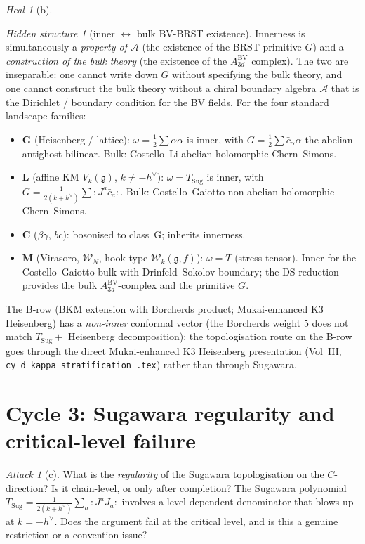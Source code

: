 \documentclass{article}
\theoremstyle{definition}
\theoremstyle{remark}
\newtheorem{attack}[theorem]{Attack}
\newtheorem{heal}[theorem]{Heal}
\newtheorem{hidden}[theorem]{Hidden structure}
\newcommand{\fg}{\mathfrak{g}}
\newcommand{\cW}{\mathcal{W}}
\newcommand{\cA}{\mathcal{A}}
\begin{document}
\begin{heal}[b]
\begin{hidden}[inner $\leftrightarrow$ bulk BV-BRST existence]
\label{hidden:cycle2}
Innerness is simultaneously a \emph{property of $\cA$} (the
existence of the BRST primitive $G$) and a \emph{construction
of the bulk theory} (the existence of the
$A^{\mathrm{BV}}_{3d}$ complex). The two are inseparable: one
cannot write down $G$ without specifying the bulk theory, and
one cannot construct the bulk theory without a chiral
boundary algebra $\cA$ that is the Dirichlet / boundary
condition for the BV fields. For the four standard
landscape families:
\begin{itemize}
\item \textbf{G} (Heisenberg / lattice): $\omega =
\tfrac{1}{2}\sum \alpha \alpha$ is inner, with
$G = \tfrac{1}{2}\sum \bar c_\alpha \alpha$ the abelian
antighost bilinear. Bulk: Costello--Li abelian holomorphic
Chern--Simons.
\item \textbf{L} (affine KM $V_k(\fg)$, $k \neq -h^\vee$):
$\omega = T_{\mathrm{Sug}}$ is inner, with
$G = \tfrac{1}{2(k+h^\vee)} \sum :J^a \bar c_a:$. Bulk:
Costello--Gaiotto non-abelian holomorphic Chern--Simons.
\item \textbf{C} ($\beta\gamma$, $bc$): bosonised to
class~G; inherits innerness.
\item \textbf{M} (Virasoro, $\cW_N$, hook-type
$\cW_k(\fg, f)$): $\omega = T$ (stress tensor). Inner for
the Costello--Gaiotto bulk with Drinfeld--Sokolov boundary;
the DS-reduction provides the bulk
$A^{\mathrm{BV}}_{3d}$-complex and the primitive $G$.
\end{itemize}
The B-row (BKM extension with Borcherds product; Mukai-enhanced
K3 Heisenberg) has a \emph{non-inner} conformal vector
(the Borcherds weight $5$ does not match $T_{\mathrm{Sug}} + $
Heisenberg decomposition): the topologisation route on the
B-row goes through the direct Mukai-enhanced K3 Heisenberg
presentation (Vol~III, \texttt{cy\_d\_kappa\_stratification%
.tex}) rather than through Sugawara.
\end{hidden}

\section{Cycle 3: Sugawara regularity and critical-level failure}
\label{sec:opus-cycle-3}

\begin{attack}[c]
\label{att:cycle3}
What is the \emph{regularity} of the Sugawara topologisation
on the $C$-direction? Is it chain-level, or only after
completion? The Sugawara polynomial
$T_{\mathrm{Sug}} = \frac{1}{2(k+h^\vee)}\sum_a {:}J^a J_a{:}$
involves a level-dependent denominator that blows up at
$k = -h^\vee$. Does the argument fail at the critical level,
and is this a genuine restriction or a convention issue?
\end{attack}


\end{heal}
\end{document}
